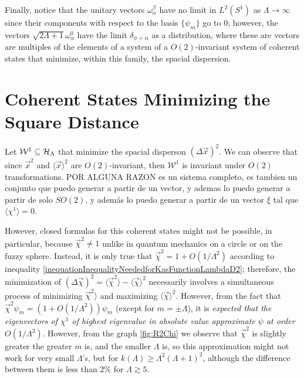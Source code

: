 Finally, notice that the unitary vectors $\omega^\beta_\alpha$ have no limit in $L^2(S^1)$ as $\Lambda \to \infty$ since their components with respect to the basis $\{\psi_m\}$ go to $0$; however, the vectors $\sqrt{2\Lambda + 1}\omega^0_\alpha$ have the limit $\delta_{\phi = \alpha}$ as a distribution, where these are vectors are multiples of the elements of a system of a $O(2)$-invariant system of coherent states that minimize, within this family, the spacial dispersion.

\section{Coherent States Minimizing the Square Distance}

Let $\mathcal{W}^1 \subseteq \mathcal H_\Lambda$ that minimize the spacial disperson $(\Delta \vec x)^2$. We can observe that since $\vec x^2$ and $\langle \vec x \rangle^2$ are $O(2)$-invariant, then $\mathcal W^1$ is invariant under $O(2)$ transformations. POR ALGUNA RAZON es un sistema completo, es tambien un conjunto que puedo generar a partir de un vector, y ademas lo puedo generar a partir de solo $SO(2)$, y además lo puedo generar a partir de un vector $\xi$ tal que $\langle \chi^1 \rangle = 0$.

However, closed formulas for this coherent states might not be possible, in particular, because $\vec \chi^2 \neq 1$ unlike in quantum mechanics on a circle or on the fuzzy sphere. Instead, it is only true that $\vec \chi^2  = 1 + O(1/\Lambda^2)$ according to inequality \ref{inequationInequalityNeededforKasFunctionLambdaD2}; therefore, the minimization of $ (\Delta \vec \chi)^2 = \langle \vec \chi^2 \rangle - \langle \vec \chi \rangle ^2$ necessarily involves a simultaneous process of minimizing $\vec \chi^2 \rangle$ and maximizing $\langle \vec \chi\rangle ^2$. However, from the fact that $\vec \chi ^2 \psi_m  = (1 + O(1/\Lambda^2) )\psi_m$ (except for $m = \pm \Lambda$), it is \textit{expected \cite{FioreCoherent2020} that the eigenvectors of $\chi^1$ of highest eigenvalue in absolute value approximate $\psi$ at order $O(1/\Lambda^2)$}. However, from the graph \ref{fig:R2Chi} we observe that $\vec \chi^2$ is slightly greater the greater $m$ is, and the smaller $\Lambda$ is, so this approximation might not work for very small $\Lambda$'s, but for $k(\Lambda) \geq \Lambda^2(\Lambda+1)^2$, although the difference between them is less than $2\%$ for $\Lambda \gtrsim 5$.

